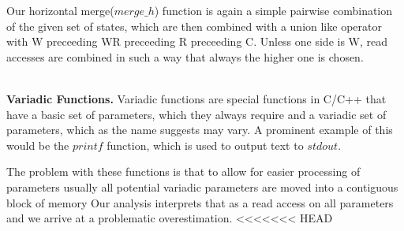 Our horizontal merge($merge\_h$) function is again a simple pairwise combination of the given set of states, which are then combined with a union 
like operator with W preceeding WR preceeding R preceeding C. Unless one side is W, read accesses are combined in such a way that always the higher one is chosen.

%

~\\
\textbf{Variadic Functions.}
\label{subsection:variadicfunctions}
Variadic functions are special functions in C/C++ that have a basic set of parameters, 
which they always require and a variadic set of parameters, which as the name suggests 
may vary. A prominent example of this would be the $printf$ function, which is used 
to output text to $stdout$.

The problem with these functions is that to allow for easier processing of parameters
usually all potential variadic parameters are moved into a contiguous block of memory
Our analysis interprets that as a read access on all 
parameters and we arrive at a problematic overestimation. 
<<<<<<< HEAD

